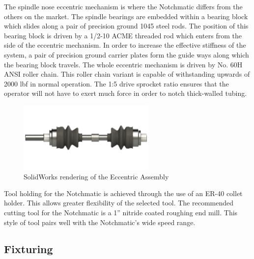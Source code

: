 The spindle nose eccentric mechanism is where the Notchmatic differs from the others on the market. The spindle bearings are embedded within a bearing block which slides along a pair of precision ground 1045 steel rods. The position of this bearing block is driven by a 1/2-10 ACME threaded rod which enters from the side of the eccentric mechanism. In order to increase the effective stiffness of the system, a pair of precision ground carrier plates form the guide ways along which the bearing block travels. The whole eccentric mechanism is driven by No. 60H ANSI roller chain. This roller chain variant is capable of withstanding upwards of 2000 lbf in normal operation. The 1:5 drive sprocket ratio ensures that the operator will not have to exert much force in order to notch thick-walled tubing. 

\begin{figure}[H]
    \centering
    \includegraphics[width=0.6\textwidth]{./images/Chapter2-MachineDescription/Eccentric}
    \caption{SolidWorks rendering of the Eccentric Assembly}
    \label{fig:Eccentric}
\end{figure}

Tool holding for the Notchmatic is achieved through the use of an ER-40 collet holder. This allows greater flexibility of the selected tool. The recommended cutting tool for the Notchmatic is a 1” nitride coated roughing end mill. This style of tool pairs well with the Notchmatic’s wide speed range.

\newpage

\subsection{Fixturing}

